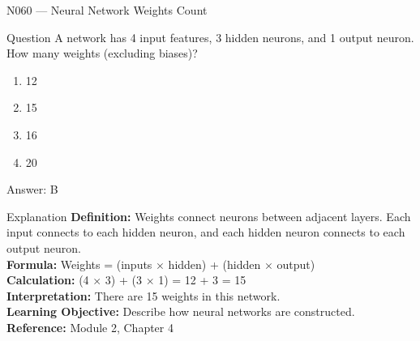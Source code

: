 \documentclass[aspectratio=169,8pt]{beamer}
\begin{document}
	\begin{frame}{N060 --- Neural Network Weights Count}
		\begin{block}{Question}
			A network has 4 input features, 3 hidden neurons, and 1 output neuron. How many weights (excluding biases)?
			\begin{enumerate}
				\item 12
				\item 15
				\item 16
				\item 20
			\end{enumerate}
		\end{block}
		\begin{exampleblock}{Answer: B}\end{exampleblock}
		\begin{block}{Explanation}
			\textbf{Definition:} Weights connect neurons between adjacent layers. Each input connects to each hidden neuron, and each hidden neuron connects to each output neuron.\\
			\textbf{Formula:} Weights = (inputs $\times$ hidden) + (hidden $\times$ output)\\
			\textbf{Calculation:} (4 $\times$ 3) + (3 $\times$ 1) = 12 + 3 = 15\\
			\textbf{Interpretation:} There are 15 weights in this network.\\
			\textbf{Learning Objective:} Describe how neural networks are constructed.\\
			\textbf{Reference:} Module 2, Chapter 4
		\end{block}
	\end{frame}
	
\end{document}
